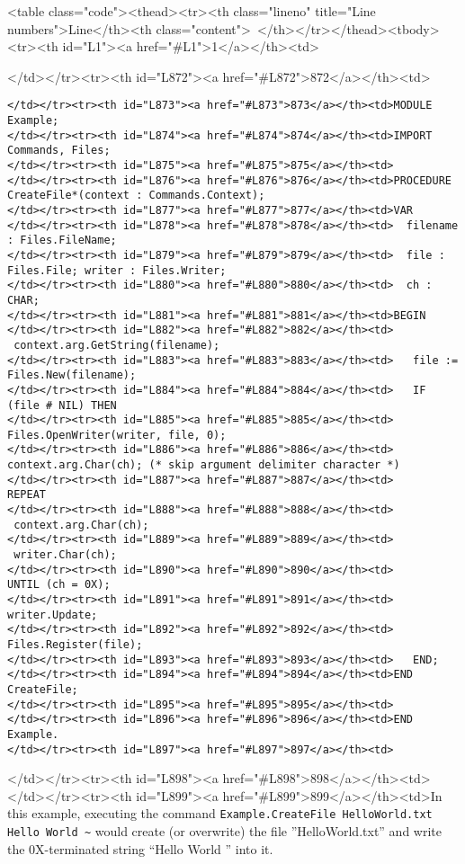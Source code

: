 <table class="code"><thead><tr><th class="lineno" title="Line numbers">Line</th><th class="content"> </th></tr></thead><tbody><tr><th id="L1"><a href="#L1">1</a></th><td>\documentclass[a4paper,11pt]{article}
\begin{document}
</td></tr><tr><th id="L872"><a href="#L872">872</a></th><td>\begin{lstlisting}[language=Oberon,frame=none,caption={Example: Create A New File}]
</td></tr><tr><th id="L873"><a href="#L873">873</a></th><td>MODULE Example;
</td></tr><tr><th id="L874"><a href="#L874">874</a></th><td>IMPORT Commands, Files;
</td></tr><tr><th id="L875"><a href="#L875">875</a></th><td>
</td></tr><tr><th id="L876"><a href="#L876">876</a></th><td>PROCEDURE CreateFile*(context : Commands.Context);
</td></tr><tr><th id="L877"><a href="#L877">877</a></th><td>VAR
</td></tr><tr><th id="L878"><a href="#L878">878</a></th><td>  filename : Files.FileName;
</td></tr><tr><th id="L879"><a href="#L879">879</a></th><td>  file : Files.File; writer : Files.Writer;
</td></tr><tr><th id="L880"><a href="#L880">880</a></th><td>  ch : CHAR;
</td></tr><tr><th id="L881"><a href="#L881">881</a></th><td>BEGIN
</td></tr><tr><th id="L882"><a href="#L882">882</a></th><td>   context.arg.GetString(filename);
</td></tr><tr><th id="L883"><a href="#L883">883</a></th><td>   file := Files.New(filename);
</td></tr><tr><th id="L884"><a href="#L884">884</a></th><td>   IF (file # NIL) THEN
</td></tr><tr><th id="L885"><a href="#L885">885</a></th><td>      Files.OpenWriter(writer, file, 0);
</td></tr><tr><th id="L886"><a href="#L886">886</a></th><td>      context.arg.Char(ch); (* skip argument delimiter character *)
</td></tr><tr><th id="L887"><a href="#L887">887</a></th><td>      REPEAT
</td></tr><tr><th id="L888"><a href="#L888">888</a></th><td>         context.arg.Char(ch);
</td></tr><tr><th id="L889"><a href="#L889">889</a></th><td>         writer.Char(ch);
</td></tr><tr><th id="L890"><a href="#L890">890</a></th><td>      UNTIL (ch = 0X);
</td></tr><tr><th id="L891"><a href="#L891">891</a></th><td>      writer.Update;
</td></tr><tr><th id="L892"><a href="#L892">892</a></th><td>      Files.Register(file);
</td></tr><tr><th id="L893"><a href="#L893">893</a></th><td>   END;
</td></tr><tr><th id="L894"><a href="#L894">894</a></th><td>END CreateFile;
</td></tr><tr><th id="L895"><a href="#L895">895</a></th><td>
</td></tr><tr><th id="L896"><a href="#L896">896</a></th><td>END Example.
</td></tr><tr><th id="L897"><a href="#L897">897</a></th><td>\end{lstlisting}
</td></tr><tr><th id="L898"><a href="#L898">898</a></th><td>
</td></tr><tr><th id="L899"><a href="#L899">899</a></th><td>In this example, executing the command \verb+Example.CreateFile HelloWorld.txt Hello World ~+ would create (or overwrite) the file ''HelloWorld.txt'' and write the 0X-terminated string ``Hello World '' into it.
\end{document}
